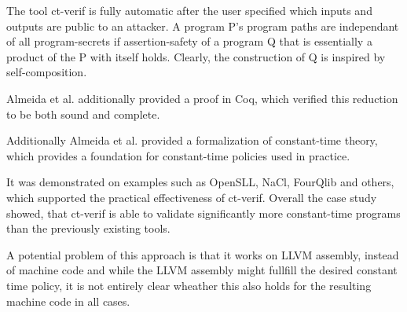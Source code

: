 \documentclass[a4paper,UKenglish]{lipics-v2018}
\begin{document}
The tool ct-verif is fully automatic after the user specified which inputs and outputs are public to an attacker. A program P's program paths are independant of all program-secrets if assertion-safety of a program Q that is essentially a product of the P with itself holds.\cite{verifying_constant_time_implementations} Clearly, the construction of Q is inspired by self-composition. 

Almeida et al. additionally provided a proof in Coq, which verified this reduction to be both sound and complete.\cite{verifying_constant_time_implementations}

Additionally Almeida et al. provided a formalization of constant-time theory, which provides a foundation for constant-time policies used in practice.

It was demonstrated on examples such as OpenSLL, NaCl, FourQlib and others, which supported the practical effectiveness of ct-verif. Overall the case study showed, that ct-verif is able to validate significantly more constant-time programs than the previously existing tools.\cite{verifying_constant_time_implementations}

A potential problem of this approach is that it works on LLVM assembly, instead of machine code and while the LLVM assembly might fullfill the desired constant time policy, it is not entirely clear wheather this also holds for the resulting machine code in all cases.\cite{verifying_constant_time_implementations}



\newpage

\end{document}
